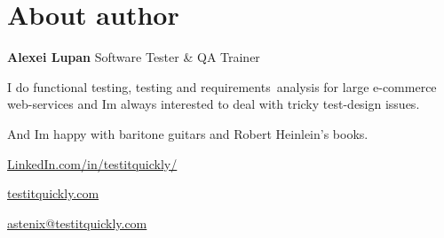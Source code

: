 \section*{About author}
\label{sec:About author}

\begin{minipage}{0.45\textwidth}

\Huge \textbf{Alexei Lupan} \newline
\normalsize Software Tester \& QA Trainer 

\bigskip

\begin{flushleft}
I do functional testing, testing and \mbox{requirements analysis} for large e-commerce web-services  and I\textquotesingle m always interested to deal with tricky test-design issues.
\end{flushleft}

And I\textquotesingle m happy with baritone guitars and Robert Heinlein's books.

\bigskip

\href{https://www.linkedin.com/in/testitquickly/}{LinkedIn.com/in/testitquickly/} 

\href{https://testitquickly.com/}{testitquickly.com}
 
\href{mailto:astenix@testitquickly.com}{astenix@testitquickly.com} 

\end{minipage} %
\begin{minipage}{0.3\textwidth} %
\end{minipage}